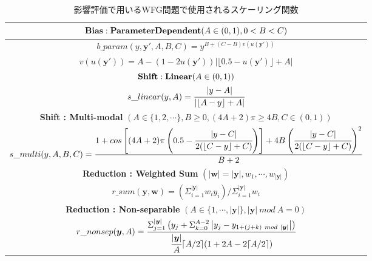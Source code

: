 \documentclass[../main/main]{subfiles}
\begin{document}
\begin{table}[htbp]
\fontsize{9.5pt}{9.5pt} \selectfont
\centering
\caption{影響評価で用いるWFG問題で使用されるスケーリング関数}
\vspace{0.1cm}
\label{wfg_trans}
\begin{tabular}{|c|}
\hline 
${\bf Bias : Parameter Dependent} (A \in (0,1), 0 < B < C)$\\
\hline
$b\_param(y, \bm{y}\prime, A, B, C) = y^{B+(C-B) v ( u (\bm{y} \prime ))}$\\
$v ( u (\bm{y} \prime )) = A - (1 - 2 u (\bm{y} \prime )) \left| \lfloor 0.5 - u (\bm{y} \prime ) \rfloor + A \right|$\\
\hline
\hline
${\bf Shift : Linear} (A \in (0,1))$\\
\hline
$s\_linear(y, A) = \cfrac{|y - A|}{|\lfloor A - y \rfloor + A|}$\\
\hline
\hline
{\bf Shift : Multi-modal} $(A \in \{1, 2, \cdots\}, B \geq 0, (4A + 2)\pi \geq 4B, C \in (0,1)) $\\
\hline
$s\_multi(y, A, B, C) = \cfrac{1 + cos \left[ (4A+2) \pi \left( 0.5 - \cfrac{|y - C|}{2(\lfloor C - y \rfloor + C)} \right) \right] + 4B \left( \cfrac{|y - C|}{2(\lfloor C - y \rfloor + C) }  \right) ^ 2}{B+2}$\\
\hline
\hline
{ \bf Reduction : Weighted Sum} $(|\bm{w}| = |\bm{y}|, w_1, \cdots, w_{|\bm{y}|}) $\\
\hline
$r\_sum (\bm{y}, \bm{w}) =  \left( \Sigma^{|\bm{y}|}_{i=1} w_i y_i \right) / \Sigma^{|\bm{y}|}_{i=1} w_i$\\
\hline
\hline
{\bf Reduction : Non-separable} $(A \in \{1,  \cdots, |\bm{y}| \}, |\bm{y}| \ mod \ A = 0) $\\
\hline
$r\_nonsep (\bm{y}, A) = \cfrac{\Sigma^{|\bm{y}|}_{j=1}\left(  y_j + \Sigma^{A-2}_{k=0} \left| y_j - y_{1 + (j + k) \ mod \  | \bm{y} | } \right| \right)}{\cfrac{|\bm{y}|}{A} \lceil A / 2 \rceil (1 + 2A - 2 \lceil A / 2 \rceil)}$\\
\hline
\end{tabular}
\end{table}
\end{document}
